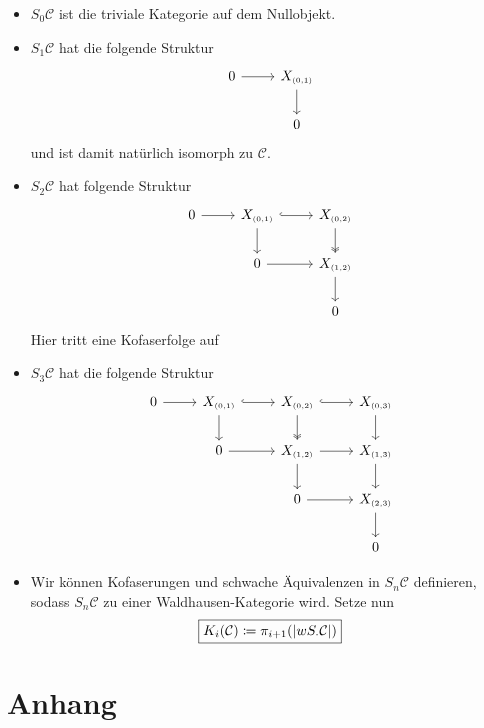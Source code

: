 \begin{itemize}
	\item $S_0 \mathcal{C}$ ist die triviale Kategorie auf dem Nullobjekt.
	\item $S_1 \mathcal{C}$ hat die folgende Struktur
	\[
		\begin{tikzcd}
			0 \rar & X_\ssbrace{0,1} \dar \\
			& 0
		\end{tikzcd}
	\]
	und ist damit natürlich isomorph zu $\mathcal{C}$.
	\item $S_2 \mathcal{C}$ hat folgende Struktur
	\[
		\begin{tikzcd}
			0 \rar & X_\ssbrace{0,1} \rar[hook] \dar & X_\ssbrace{0,2} \dar[two heads] \\
			& 0 \rar & X_\ssbrace{1,2} \dar \\
			& & 0
		\end{tikzcd}
	\]
	Hier tritt eine Kofaserfolge auf
	\item $S_3 \mathcal{C}$ hat die folgende Struktur
	\[
		\begin{tikzcd}
			0 \rar & X_\ssbrace{0,1} \dar \rar[hook] & X_\ssbrace{0,2} \dar[two heads] \rar[hook] & X_\ssbrace{0,3} \dar \\
			& 0 \rar & X_\ssbrace{1,2} \rar \dar & X_\ssbrace{1,3} \dar \\
			& & 0 \rar & X_\ssbrace{2,3} \dar \\
			& & & 0
		\end{tikzcd}
	\]
	\item Wir können Kofaserungen und schwache Äquivalenzen in $S_n \mathcal{C}$ definieren, sodass $S_n \mathcal{C}$ zu einer Waldhausen-Kategorie wird.
	Setze nun
	\[
		\boxed{K_i(\mathcal{C}) \coloneqq \pi_{i+1} \enbrace*{\abs*{w S_\cdot \mathcal{C}} }}
	\]
\end{itemize}


\cleardoubleoddemptypage
{}
\setcounter{page}{1}
\cleardoubleoddemptypage
\appendix

\section{Anhang} %
\label{sec:anhang}

\printindex
\printbibliography
\listoffigures
\todototoc
{}

